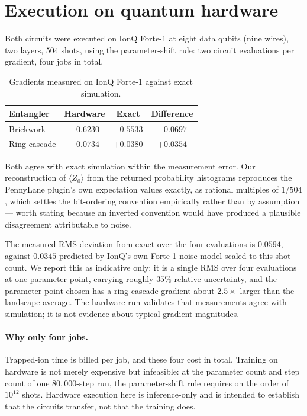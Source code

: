 \documentclass[11pt]{article}
\newif\ifdraft
\newcommand{\pend}[1]{%
  \ifdraft\textcolor{PendFG}{\textbf{[TODO:} \textit{#1}\textbf{]}}\fi}
\begin{document}
\section{Execution on quantum hardware}\label{sec:hardware}
Both circuits were executed on IonQ Forte-1 at eight data qubits (nine
wires), two layers, $504$ shots, using the parameter-shift rule: two
circuit evaluations per gradient, four jobs in total.

\begin{table}[h]\centering\small
\caption{Gradients measured on IonQ Forte-1 against exact simulation.}
\begin{tabular}{lccc}
\toprule
Entangler & Hardware & Exact & Difference \\
\midrule
Brickwork    & $-0.6230$ & $-0.5533$ & $-0.0697$ \\
Ring cascade & $+0.0734$ & $+0.0380$ & $+0.0354$ \\
\bottomrule
\end{tabular}
\end{table}

Both agree with exact simulation within the measurement error. Our
reconstruction of $\langle Z_0 \rangle$ from the returned probability
histograms reproduces the PennyLane plugin's own expectation values
exactly, as rational multiples of $1/504$, which settles the
bit-ordering convention empirically rather than by assumption --- worth
stating because an inverted convention would have produced a plausible
disagreement attributable to noise.

The measured RMS deviation from exact over the four evaluations is
$0.0594$, against $0.0345$ predicted by IonQ's own Forte-1 noise model
scaled to this shot count. We report this as indicative only: it is a
single RMS over four evaluations at one parameter point, carrying
roughly $35\%$ relative uncertainty, and the parameter point chosen has
a ring-cascade gradient about $2.5\times$ larger than the landscape
average. The hardware run validates that measurements agree with
simulation; it is not evidence about typical gradient magnitudes.

\paragraph{Why only four jobs.} Trapped-ion time is billed per job, and
these four cost \pend{amount} in total. Training on hardware is not
merely expensive but infeasible: at the parameter count and step count
of one $80{,}000$-step run, the parameter-shift rule requires on the
order of $10^{12}$ shots. Hardware execution here is inference-only and
is intended to establish that the circuits transfer, not that the
training does.
\end{document}
